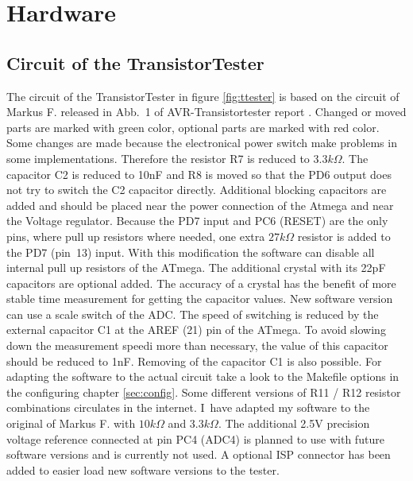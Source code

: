 \chapter{Hardware}

\section{Circuit of the TransistorTester}
The circuit of the TransistorTester in figure \ref{fig:ttester} is based on the circuit of
 Markus F. released in Abb.~1 of AVR-Transistortester report \cite{Frejek}.
Changed or moved parts are marked with green color, optional parts are marked with red color.
Some changes are made because the electronical power switch make problems in some implementations.
Therefore the resistor R7 is reduced to \(3.3k\Omega\). The capacitor C2 is reduced to
10nF and R8 is moved so that the PD6 output does not try to switch the C2 capacitor directly.
 Additional blocking capacitors are added and should be placed
near the power connection of the Atmega and near the Voltage regulator.
Because the PD7 input and PC6 (RESET) are the only pins, where pull up resistors where
needed, one extra \(27k\Omega\) resistor is added to the PD7 (pin~13) input. With this modification
the software can disable all internal pull up resistors of the ATmega.
The additional crystal with its 22pF capacitors are optional added. 
The accuracy of a crystal has the benefit of more stable time measurement for getting the
capacitor values.
New software version can use a scale switch of the ADC. The speed of switching is reduced
by the external capacitor C1 at the AREF (21) pin of the ATmega. To avoid slowing down the
measurement speedi more than necessary, the value of this capacitor should be reduced to 1nF.
Removing of the capacitor C1 is also possible.
For adapting the software to the actual circuit take a look to the Makefile options in the
configuring chapter \ref{sec:config}. Some different versions of R11 / R12 resistor combinations circulates
in the internet. I~have adapted my software to the original of Markus F. \cite{Frejek} with \(10k\Omega\) and \(3.3k\Omega\).
The additional 2.5V precision voltage reference connected at pin PC4 (ADC4) is planned to use
with future software versions and is currently not used.
A optional ISP connector has been added to easier load new software versions to the tester.


